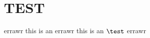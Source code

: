 \documentclass[11pt]{article}
\begin{document}
\section{TEST}
errawr %
this is an \test
errawr %
this is an $\test$
errawr %
\end{document}
